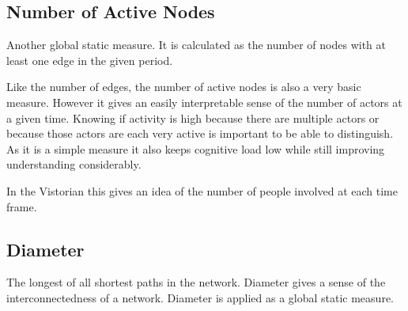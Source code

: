 \subsection{Number of Active Nodes}
Another global static measure. It is calculated as the number of nodes with at least one edge in the given period.

Like the number of edges, the number of active nodes is also a very basic measure. However it gives an easily interpretable sense of the number of actors at a given time. Knowing if activity is high because there are multiple actors or because those actors are each very active is important to be able to distinguish. As it is a simple measure it also keeps cognitive load low while still improving understanding considerably.

In the Vistorian this gives an idea of the number of people involved at each time frame. 


\subsection{Diameter}
The longest of all shortest paths in the network. Diameter gives a sense of the interconnectedness of a network. Diameter is applied as a global static measure.

